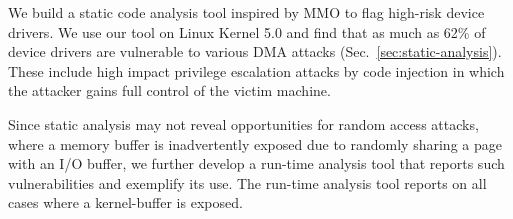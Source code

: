 We build a static code analysis tool inspired by MMO to flag high-risk device drivers. 
We use our tool on Linux Kernel 5.0 and find that as much as 62\% of device drivers are vulnerable to various DMA attacks (Sec.~\ref{sec:static-analysis}). 
These include high impact privilege escalation attacks by code injection in which the attacker gains full control of the victim machine.


Since static analysis may not reveal opportunities for random access attacks, where a memory buffer is inadvertently exposed due to randomly sharing a page with an I/O buffer, we further develop a run-time analysis tool that reports such vulnerabilities and exemplify its use. The run-time analysis tool reports on all cases where a kernel-buffer is exposed. 



